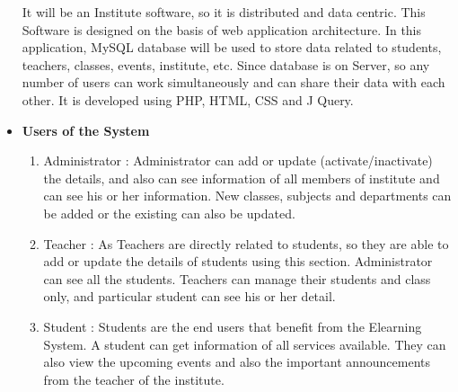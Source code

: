 \begin{itemize}
It will be an Institute software, so it is distributed and data centric. 
This Software is designed on the basis of web application architecture. 
In this application, MySQL database will be used to store data related 
to students, teachers, classes, events, institute, etc. Since 
database is on Server, so any number of users can work simultaneously 
and can share their data with each other. It is developed using PHP, HTML, CSS and J Query.
\item{\bf Users of the System}
\begin{enumerate} 
\item Administrator : Administrator can add or update 
(activate/inactivate) the details, and also can see information of all 
members of institute and can see his or her information. New classes, subjects and departments can be added or the existing can also be updated.
\item Teacher : As Teachers are directly related to students, so they 
are able to add or update the details of students using this section. 
Administrator can see all the students. Teachers can manage their 
students and class only, and particular student can see his or her detail.
\item Student : Students are the end users that benefit from the 
Elearning System. A student can get information of all services 
available. They can also view the upcoming events and also the important announcements
from the teacher of the institute.
\end{enumerate}
\end{itemize}
